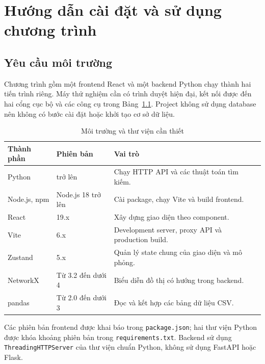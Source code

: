 
\chapter{Hướng dẫn cài đặt và sử dụng chương trình}
\label{chap:program-instructions}

\section{Yêu cầu môi trường}

Chương trình gồm một frontend React và một backend Python chạy thành hai tiến
trình riêng. Máy thử nghiệm cần có trình duyệt hiện đại, kết nối được đến hai
cổng cục bộ và các công cụ trong Bảng~\ref{tab:environment-requirements}.
Project không sử dụng database nên không có bước cài đặt hoặc khởi tạo cơ sở
dữ liệu.

\begin{table}[h!]
\centering
\caption{Môi trường và thư viện cần thiết}
\label{tab:environment-requirements}
\begin{tabular}{>{\raggedright\arraybackslash}p{4.1cm}
                >{\raggedright\arraybackslash}p{4.0cm}
                >{\raggedright\arraybackslash}p{6.0cm}}
\toprule
Thành phần & Phiên bản & Vai trò \\
\midrule
Python & 3.10 trở lên & Chạy HTTP API và các thuật toán tìm kiếm. \\
Node.js, npm & Node.js 18 trở lên & Cài package, chạy Vite và build frontend. \\
React & 19.x & Xây dựng giao diện theo component. \\
Vite & 6.x & Development server, proxy API và production build. \\
Zustand & 5.x & Quản lý state chung của giao diện và mô phỏng. \\
NetworkX & Từ 3.2 đến dưới 4 & Biểu diễn đồ thị có hướng trong backend. \\
pandas & Từ 2.0 đến dưới 3 & Đọc và kết hợp các bảng dữ liệu CSV. \\
\bottomrule
\end{tabular}
\end{table}

Các phiên bản frontend được khai báo trong \texttt{package.json}; hai thư viện
Python được khóa khoảng phiên bản trong \texttt{requirements.txt}. Backend sử
dụng \texttt{ThreadingHTTPServer} của thư viện chuẩn Python, không sử dụng
FastAPI hoặc Flask.

